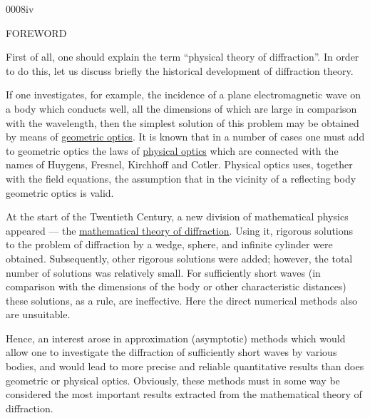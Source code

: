 \begin{scanpage}{0008}{iv}
\begin{center}FOREWORD\end{center}
First of all, one should explain the term ``physical theory of diffraction''. In order to do this, let us discuss briefly the historical development of diffraction theory.

If one investigates, for example, the incidence of a plane electromagnetic wave on a body which conducts well, all the dimensions of which are large in comparison with the wavelength, then the simplest solution of this problem may be obtained by means of \uline{geometric optics}. It is known that in a number of cases one must add to geometric optics the laws of \uline{physical optics} which are connected with the names of Huygens, Fresnel, Kirchhoff and Cotler. Physical optics uses, together with the field equations, the assumption that in the vicinity of a reflecting body geometric optics is valid.

At the start of the Twentieth Century, a new division of mathematical physics appeared --- the \uline{mathematical theory of diffraction}. Using it, rigorous solutions to the problem of diffraction by a wedge, sphere, and infinite cylinder were obtained. Subsequently, other rigorous solutions were added; however, the total number of solutions was relatively small. For sufficiently short waves (in comparison with the dimensions of the body or other characteristic distances) these solutions, as a rule, are ineffective. Here the direct numerical methods also are unsuitable.

Hence, an interest arose in approximation (asymptotic) methods which would allow one to investigate the diffraction of sufficiently short waves by various bodies, and would lead to more precise and reliable quantitative results than does geometric or physical optics. Obviously, these methods must in some way be considered the most important results extracted from the mathematical theory of diffraction.
\end{scanpage}
